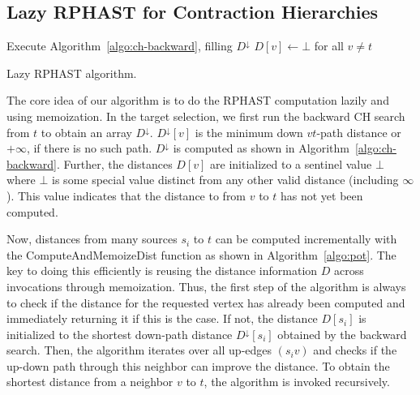\documentclass[manuscript,review]{acmart}
\newcommand*{\echu}{E^{\uparrow}}
\begin{document}
\subsection{Lazy RPHAST for Contraction Hierarchies}

\begin{algorithm2e}[tb]

Execute Algorithm~\ref{algo:ch-backward}, filling $D^{\downarrow}$\;
$D[v] \gets \bot$ for all $v\neq t$\;

\Fn{\Dist{$u$}}{
	\If{$D[u] = \bot$}{
		$D[u]\leftarrow D^{\downarrow}[u]$\;
		\For{all up-edges $uv \in \echu$}{
      $D[u]\leftarrow\min(D[u],w(uv)+\Dist(v))$\;
		}
	}
	\Return{$D[u]$}\;
}
\caption{Lazy RPHAST algorithm.}
\label{algo:pot}
\end{algorithm2e}

The core idea of our algorithm is to do the RPHAST computation lazily and using memoization.
In the target selection, we first run the backward CH search from $t$ to obtain an array $D^{\downarrow}$.
$D^{\downarrow}[v]$ is the minimum down $vt$-path distance or $+\infty$, if there is no such path.
$D^{\downarrow}$ is computed as shown in Algorithm~\ref{algo:ch-backward}.
Further, the distances $D[v]$ are initialized to a sentinel value $\bot$ where $\bot$ is some special value distinct from any other valid distance (including $\infty$).
This value indicates that the distance to from $v$ to $t$ has not yet been computed.

Now, distances from many sources $s_i$ to $t$ can be computed incrementally with the \textsf{ComputeAndMemoizeDist} function as shown in Algorithm~\ref{algo:pot}.
The key to doing this efficiently is reusing the distance information $D$ across invocations through memoization.
Thus, the first step of the algorithm is always to check if the distance for the requested vertex has already been computed and immediately returning it if this is the case.
If not, the distance $D[s_i]$ is initialized to the shortest down-path distance $D^{\downarrow}[s_i]$ obtained by the backward search.
Then, the algorithm iterates over all up-edges $(s_i v)$ and checks if the up-down path through this neighbor can improve the distance.
To obtain the shortest distance from a neighbor $v$ to $t$, the algorithm is invoked recursively.
\end{document}

